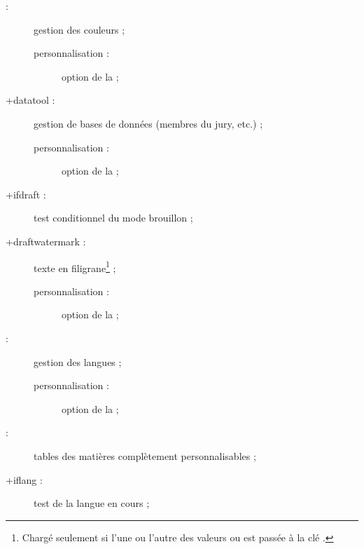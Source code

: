 \begin{description}
\item[ :] %
  gestion des couleurs ;
  \begin{description}
  \item[personnalisation :] option  de la \yatCl ;
  \end{description}
\item[\package*+{datatool} :] gestion de bases de données (membres du jury,
  etc.) ;
  \begin{description}
  \item[personnalisation :] option  de la \yatCl ;
  \end{description}
\item[\package*+{ifdraft} :] test conditionnel du mode brouillon ;
\item[\package+{draftwatermark} :] texte en
  filigrane\footnote{Chargé seulement si l'une ou l'autre des
    valeurs  ou  est passée à la clé
    .} ;
  \begin{description}
  \item[personnalisation :] option  de la \yatCl ;
  \end{description}
\item[ :] gestion des langues ;
  \begin{description}
  \item[personnalisation :] option  de la \yatCl ;
  \end{description}
\item[ :] tables des matières complètement personnalisables ;
\item[\package*+{iflang} :] test de la langue en cours ;

\end{description}
